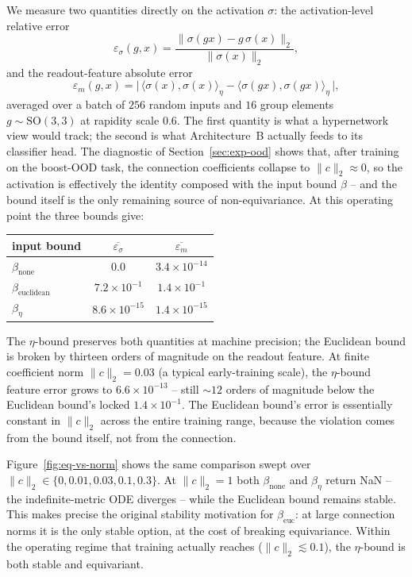 \documentclass[11pt]{article}
\begin{document}
We measure two quantities directly on the activation $\sigma$: the
activation-level relative error
\begin{equation}
  \varepsilon_\sigma(g, x)
   = \frac{\lVert \sigma(g x) - g\,\sigma(x)\rVert_2}{\lVert \sigma(x)\rVert_2},
\end{equation}
and the readout-feature absolute error
\begin{equation}
  \varepsilon_m(g, x)
   = \bigl|\,\langle \sigma(x), \sigma(x)\rangle_\eta
            - \langle \sigma(gx), \sigma(gx)\rangle_\eta\,\bigr|,
\end{equation}
averaged over a batch of $256$ random inputs and $16$ group elements
$g \sim \mathrm{SO}(3,3)$ at rapidity scale $0.6$. The first quantity is
what a hypernetwork view would track; the second is what Architecture~B
actually feeds to its classifier head. The diagnostic of
Section~\ref{sec:exp-ood} shows that, after training on the boost-OOD
task, the connection coefficients collapse to
$\lVert c\rVert_2 \approx 0$, so the activation is effectively the
identity composed with the input bound $\beta$ -- and the bound itself
is the only remaining source of non-equivariance. At this operating
point the three bounds give:
\begin{center}
\begin{tabular}{lcc}
\toprule
input bound & $\overline{\varepsilon_\sigma}$ & $\overline{\varepsilon_m}$ \\
\midrule
$\beta_{\text{none}}$       & $0.0$              & $3.4\times 10^{-14}$ \\
$\beta_{\text{euclidean}}$  & $7.2\times 10^{-1}$ & $1.4\times 10^{-1}$ \\
$\beta_\eta$                & $8.6\times 10^{-15}$ & $1.4\times 10^{-15}$ \\
\bottomrule
\end{tabular}
\end{center}
The $\eta$-bound preserves both quantities at machine precision; the
Euclidean bound is broken by thirteen orders of magnitude on the
readout feature. At finite coefficient norm
$\lVert c\rVert_2 = 0.03$ (a typical early-training scale), the
$\eta$-bound feature error grows to $6.6\times 10^{-13}$ -- still
$\sim 12$ orders of magnitude below the Euclidean bound's locked
$1.4\times 10^{-1}$. The Euclidean bound's error is essentially
constant in $\lVert c\rVert_2$ across the entire training range,
because the violation comes from the bound itself, not from the
connection.

Figure~\ref{fig:eq-vs-norm} shows the same comparison swept over
$\lVert c\rVert_2 \in \{0, 0.01, 0.03, 0.1, 0.3\}$. At
$\lVert c\rVert_2 = 1$ both $\beta_{\text{none}}$ and $\beta_\eta$
return NaN -- the indefinite-metric ODE diverges -- while the
Euclidean bound remains stable. This makes precise the original
stability motivation for $\beta_{\text{euc}}$: at large connection
norms it is the only stable option, at the cost of breaking
equivariance. Within the operating regime that training actually
reaches ($\lVert c\rVert_2 \lesssim 0.1$), the $\eta$-bound is both
stable and equivariant.
\end{document}
